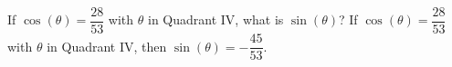 {If $\cos(\theta) = \dfrac{28}{53}$ with $\theta$ in Quadrant IV, what is $\sin(\theta)$?}
{If $\cos(\theta) = \dfrac{28}{53}$ with $\theta$ in Quadrant IV, then $\sin(\theta) = -\dfrac{45}{53}$.}